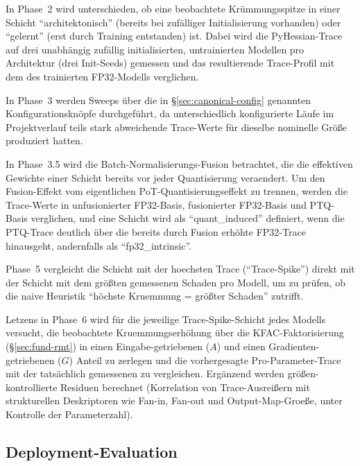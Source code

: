 In Phase~2 wird unterschieden, ob eine beobachtete Krümmungsspitze in einer Schicht \enquote{architektonisch} (bereits bei zufälliger Initialisierung vorhanden) oder \enquote{gelernt} (erst durch Training entstanden) ist. Dabei wird die PyHessian-Trace auf drei unabhängig zufällig initialisierten, untrainierten Modellen pro Architektur (drei Init-Seeds) gemessen und das resultierende Trace-Profil mit dem des trainierten FP32-Modells verglichen.
\par\medskip

In Phase~3 werden Sweeps über die in \S\ref{sec:canonical-config} genannten Konfigurationsknöpfe durchgeführt, da unterschiedlich konfigurierte Läufe im Projektverlauf teils stark abweichende Trace-Werte für dieselbe nominelle Größe produziert hatten.
\par\medskip

In Phase~3.5 wird die Batch-Normalisierungs-Fusion betrachtet, die die effektiven Gewichte einer Schicht bereits vor jeder Quantisierung veraendert. Um den Fusion-Effekt vom eigentlichen PoT-Quantisierungseffekt zu trennen, werden die Trace-Werte in unfusionierter FP32-Basis, fusionierter FP32-Basis und PTQ-Basis verglichen, und eine Schicht wird als \enquote{quant\_induced} definiert, wenn die PTQ-Trace deutlich über die bereits durch Fusion erhöhte FP32-Trace hinausgeht, andernfalls als \enquote{fp32\_intrinsic}.
\par\medskip

Phase~5 vergleicht die Schicht mit der hoechsten Trace (\enquote{Trace-Spike}) direkt mit der Schicht mit dem größten gemessenen Schaden pro Modell, um zu prüfen, ob die naive Heuristik \enquote{höchste Kruemmung = größter Schaden} zutrifft.
\par\medskip

Letzens in Phase~6 wird für die jeweilige Trace-Spike-Schicht jedes Modells versucht, die beobachtete Kruemmungserhöhung über die KFAC-Faktorisierung (\S\ref{sec:fund-rmt}) in einen Eingabe-getriebenen ($A$) und einen Gradienten-getriebenen ($G$) Anteil zu zerlegen und die vorhergesagte Pro-Parameter-Trace mit der tatsächlich gemessenen zu vergleichen. Ergänzend werden größen-kontrollierte Residuen berechnet (Korrelation von Trace-Ausreißern mit strukturellen Deskriptoren wie Fan-in, Fan-out und Output-Map-Groeße, unter Kontrolle der Parameterzahl).

\subsection{Deployment-Evaluation}
\label{sec:deployment-method}


